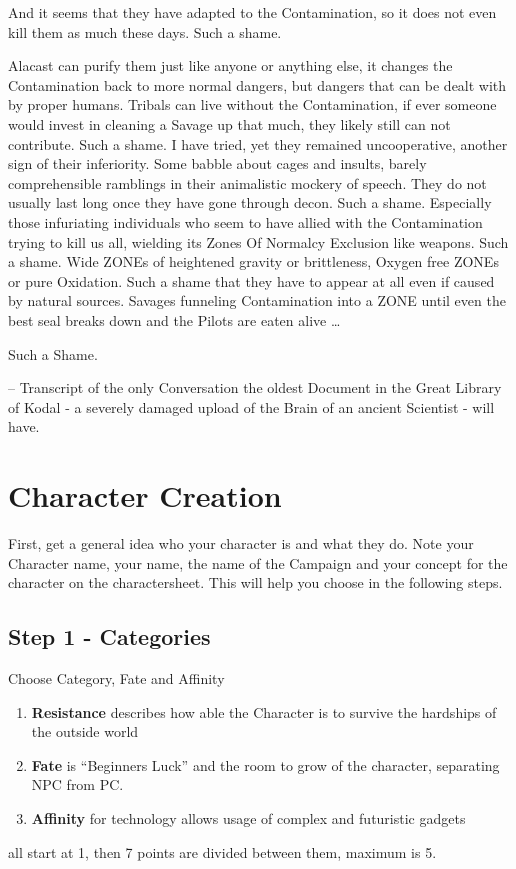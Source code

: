 \documentclass[a4paper]{book}
\begin{document}
    And it seems that they have adapted to the Contamination, so it does not even kill them as much these days.
    Such a shame. \par
    Alacast can purify them just like anyone or anything else,
    it changes the Contamination back to more normal dangers, but dangers that can be dealt with by proper humans.
    Tribals can live without the Contamination,
    if ever someone would invest in cleaning a Savage up that much, they likely still can not contribute.
    Such a shame.
    I have tried, yet they remained uncooperative, another sign of their inferiority.
    Some babble about cages and insults, barely comprehensible ramblings in their animalistic mockery of
    speech.
    They do not usually last long once they have gone through decon.
    Such a shame.
    Especially those infuriating individuals who seem to have allied with the Contamination trying to kill us all,
    wielding its Zones Of Normalcy Exclusion like weapons.
    Such a shame.
    Wide ZONEs of heightened gravity or brittleness, Oxygen free ZONEs or pure Oxidation.
    Such a shame that they have to appear at all even if caused by natural sources.
    Savages funneling Contamination into a ZONE  until even the best seal breaks down and the Pilots are eaten alive
    \ldots \par Such a Shame. \par \par
    -- Transcript of the only Conversation the oldest Document in the Great Library of Kodal - a severely damaged
    upload of the Brain of an ancient Scientist - will have.\newpage

    \chapter{Character Creation}\label{ch:charactercreation}
    First, get a general idea who your character is and what they do.
    Note your Character name, your name, the name of the
    Campaign and your concept for the character on the charactersheet.
    This will help you choose in the following steps.

    \section{Step 1 - Categories}\label{sec:step1-categories}

    Choose Category, Fate and Affinity\par
    \begin{enumerate}
        \item \textbf{Resistance} describes how able the Character is to survive the hardships of the outside world
        \item \textbf{Fate} is ``Beginners Luck'' and the room to grow of the character, separating NPC from PC\@.
        \item \textbf{Affinity} for technology allows usage of complex and futuristic gadgets
    \end{enumerate}
    all start at 1, then 7 points are divided between them, maximum is 5.
\end{document}
